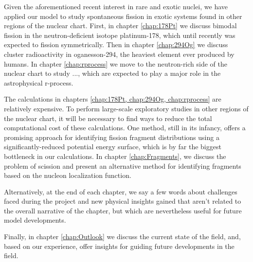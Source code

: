 Given the aforementioned recent interest in rare and exotic nuclei, we have applied our model to study spontaneous fission in exotic systems found in other regions of the nuclear chart. First, in chapter \ref{chap:178Pt} we discuss bimodal fission in the neutron-deficient isotope platinum-178, which until recently was expected to fission symmetrically. Then in chapter \ref{chap:294Og} we discuss cluster radioactivity in oganesson-294, the heaviest element ever produced by humans. In chapter \ref{chap:rprocess} we move to the neutron-rich side of the nuclear chart to study ..., which are expected to play a major role in the astrophysical r-process.

The calculations in chapters \ref{chap:178Pt, chap:294Og, chap:rprocess} are relatively expensive. To perform large-scale exploratory studies in other regions of the nuclear chart, it will be necessary to find ways to reduce the total computational cost of these calculations. One method, still in its infancy, offers a promising approach for identifying fission fragment distributions using a significantly-reduced potential energy surface, which is by far the biggest bottleneck in our calculations. In chapter \ref{chap:Fragments}, we discuss the problem of scission and present an alternative method for identifying fragments based on the nucleon localization function.

Alternatively, at the end of each chapter, we say a few words about challenges faced during the project and new physical insights gained that aren't related to the overall narrative of the chapter, but which are nevertheless useful for future model developments.

Finally, in chapter \ref{chap:Outlook} we discuss the current state of the field, and, based on our experience, offer insights for guiding future developments in the field.